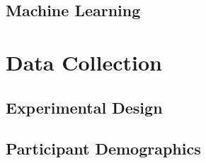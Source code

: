\subsection{Machine Learning}
\label{sec:Approach:Machine-Learning}

\section{Data Collection}
\label{sec:Data-Collection}

\subsection{Experimental Design}
\label{sec:Data-Collection:Experimental-Design}

\subsection{Participant Demographics}
\label{sec:Data-Collection:Participant-Demographics}